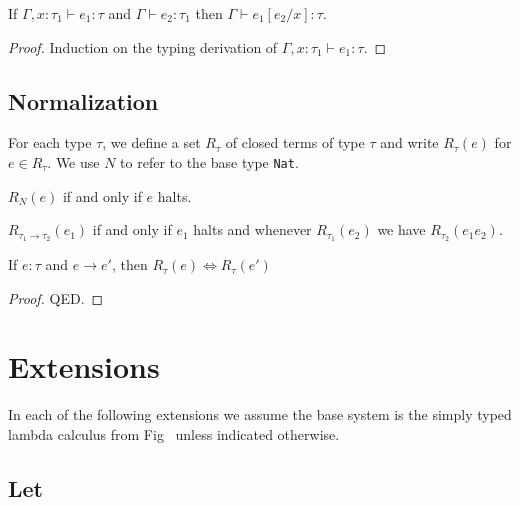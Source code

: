 \documentclass[nonacm]{acmart}
\newcommand{\nat}{\texttt{Nat}}
\begin{document}
\begin{lemma}
  If \(\Gamma, x : \tau_1 \vdash e_1 : \tau \) and \(\Gamma \vdash e_2 : \tau_1\)
  then \(\Gamma \vdash e_1[e_2/x] : \tau \).
\end{lemma}

\begin{proof}
  Induction on the typing derivation of \(\Gamma, x : \tau_1 \vdash e_1 : \tau \).
\end{proof}

\subsection{Normalization}

For each type \(\tau \), we define a set \(R_\tau \) of closed terms of type \(\tau \)
and write \(R_\tau (e) \) for \(e \in R_\tau \). We use \(N\) to refer to the base type \nat.

\begin{definition}
  \(R_N (e) \) if and only if \(e\) halts.
\end{definition}

\begin{definition}
  \(R_{\tau_1 \rightarrow \tau_2} (e_1) \) if and only if \(e_1\) halts and whenever
  \(R_{\tau_1} (e_2)\) we have \(R_{\tau_2} (e_1 e_2)\).
\end{definition}

\begin{lemma}
  If \(e : \tau\) and \(e \rightarrow e'\), then \(R_\tau (e) \iff R_\tau (e')\)
\end{lemma}

\begin{proof}
  QED.
\end{proof}

\section{Extensions}

In each of the following extensions we assume the base system is the simply
typed lambda calculus from Fig~\cite{fig:stlc} unless indicated otherwise.

\subsection{Let}
\end{document}
